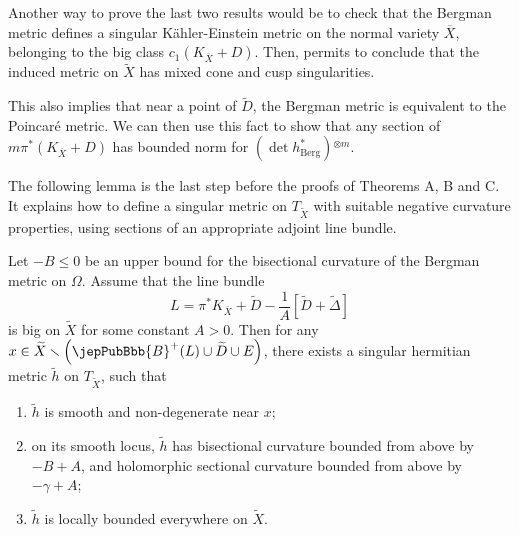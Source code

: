 \begin{remark}
Another way to prove the last two results would be to check that the Bergman metric defines a singular Kähler-Einstein metric on the normal variety $\overline{X}$, belonging to the big class $c_1(K_{\overline{X}} + D)$. Then, \cite[Prop.\,2, Th.\,3]{pubref13} permits to conclude that the induced metric on $\widetilde{X}$ has mixed cone and cusp singularities.

This also implies that near a point of $\widetilde{D}$, the Bergman metric is equivalent to the Poincaré metric. We can then use this fact to show that any section of $m \pi^\ast (K_{\overline{X}}  + D)$ has bounded norm for $(\det h_{\mathrm{Berg}}^\ast ){}^{\otimes m}$.
\end{remark}

The following lemma is the last step before the proofs of Theorems A, B and C. It explains how to define a singular metric on $T_{\widetilde{X}}$ with suitable negative curvature properties, using sections of an appropriate adjoint line bundle.

\begin{lemma} \label{published:24} Let $- B \leqslant 0$ be an upper bound for the bisectional curvature of the Bergman metric on $\Omega$. Assume that the line bundle
$$
L = \pi^\ast  K_{\overline{X}} + \widetilde{D} - \frac{1}{A} \left[ \widetilde{D} + \widetilde{\Delta} \right]
$$
is big on $\widetilde{X}$ for some constant $A > 0$. Then for any $x \in \widetilde{X} \smallsetminus \left( \jepPubBbb{B}^+(L) \cup \widetilde{D} \cup E \right)$, there exists a singular hermitian metric $\widetilde{h}$ on $T_{\widetilde{X}}$, such that
\begin{enumerate}
\item $\widetilde{h}$ is smooth and non-degenerate near $x$;

\item on its smooth locus, $\widetilde{h}$ has bisectional curvature bounded from above by $- B + A$, and holomorphic sectional curvature bounded from above by $- \gamma + A$;
\item $\widetilde{h}$ is locally bounded everywhere on $\widetilde{X}$.
\end{enumerate}
\end{lemma}

